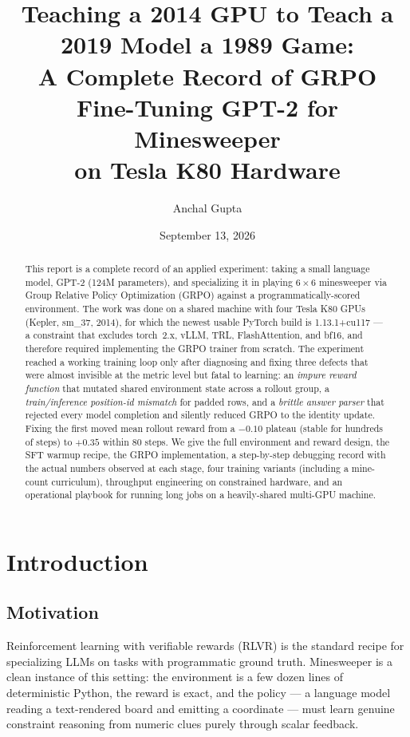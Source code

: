 \documentclass[11pt]{article}
\title{Teaching a 2014 GPU to Teach a 2019 Model a 1989 Game:\\
A Complete Record of GRPO Fine-Tuning GPT-2 for Minesweeper\\
on Tesla K80 Hardware}
\author{Anchal Gupta}
\date{September 13, 2026}
\begin{document}
\maketitle

\begin{abstract}
This report is a complete record of an applied experiment: taking a small
language model, GPT-2 (124M parameters), and specializing it in playing
$6\times6$ minesweeper via Group Relative Policy Optimization (GRPO) against a
programmatically-scored environment. The work was done on a shared machine
with four Tesla K80 GPUs (Kepler, sm\_37, 2014), for which the newest usable
PyTorch build is 1.13.1+cu117 --- a constraint that excludes torch~2.x, vLLM,
TRL, FlashAttention, and bf16, and therefore required implementing the GRPO
trainer from scratch. The experiment reached a working training loop only
after diagnosing and fixing three defects that were almost invisible at the
metric level but fatal to learning: an \emph{impure reward function} that
mutated shared environment state across a rollout group, a
\emph{train/inference position-id mismatch} for padded rows, and a \emph{brittle
answer parser} that rejected every model completion and silently reduced GRPO
to the identity update. Fixing the first moved mean rollout reward from a
$-0.10$ plateau (stable for hundreds of steps) to $+0.35$ within 80 steps.
We give the full environment and reward design, the SFT warmup recipe, the
GRPO implementation, a step-by-step debugging record with the actual numbers
observed at each stage, four training variants (including a mine-count
curriculum), throughput engineering on constrained hardware, and an
operational playbook for running long jobs on a heavily-shared multi-GPU
machine.
\end{abstract}

\tableofcontents

\section{Introduction}

\subsection{Motivation}
Reinforcement learning with verifiable rewards (RLVR) is the standard recipe
for specializing LLMs on tasks with programmatic ground truth. Minesweeper is
a clean instance of this setting: the environment is a few dozen lines of
deterministic Python, the reward is exact, and the policy --- a language model
reading a text-rendered board and emitting a coordinate --- must learn genuine
constraint reasoning from numeric clues purely through scalar feedback.
\end{document}

